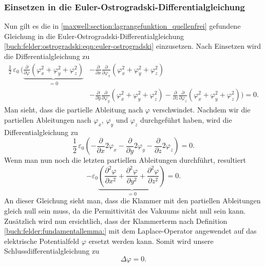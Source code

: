 \subsubsection{Einsetzen in die Euler-Ostrogradski-Differentialgleichung}
Nun gilt es die in \eqref{maxwell:section:lagrangefunktion_quellenfrei} gefundene Gleichung in die Euler-Ostrogradski-Differentialgleichung \eqref{buch:felder:ostrogradski:eqn:euler-ostrogradski} einzusetzen.
Nach Einsetzen wird die Differentialgleichung zu
\begin{align*}
\frac{1}{2}\,\varepsilon_0\,\biggl(\underbrace{\frac{\partial}{\partial\varphi}\left(\varphi_x^2 + \varphi_y^2 + \varphi_z^2\right)}_{\displaystyle=0} &- \frac{\partial}{\partial x}\frac{\partial}{\partial \varphi_x}\left(\varphi_x^2 + \varphi_y^2 + \varphi_z^2\right)\\
&- \frac{\partial}{\partial y}\frac{\partial}{\partial \varphi_y}\left(\varphi_x^2 + \varphi_y^2 + \varphi_z^2\right) - 
\frac{\partial}{\partial z}\frac{\partial}{\partial \varphi_z}\left(\varphi_x^2 + \varphi_y^2 + \varphi_z^2\right)\biggr)
=
0.
\end{align*}
Man sieht, dass die partielle Ableitung nach $\varphi$ verschwindet.
Nachdem wir die partiellen Ableitungen nach $\varphi_x$, $\varphi_y$ und $\varphi_z$ durchgeführt haben, wird die Differentialgleichung zu
\[
\frac{1}{2}\,\varepsilon_0\left(-\frac{\partial}{\partial x}2\varphi_x - \frac{\partial}{\partial y}2\varphi_y - \frac{\partial}{\partial z}2\varphi_z\right)
=
0.
\]
Wenn man nun noch die letzten partiellen Ableitungen durchführt, resultiert
\begin{equation}
	- \varepsilon_0\underbrace{\left(\frac{\partial^2\varphi}{\partial x^2} + \frac{\partial^2\varphi}{\partial y^2} + \frac{\partial^2\varphi}{\partial z^2}\right)}_{\displaystyle=0}
	=
	0.
	\label{maxwell:section:laplace_gleichung_1}
\end{equation}
An dieser Gleichung sieht man, dass die Klammer mit den partiellen Ableitungen gleich null sein muss, da die Permittivität des Vakuums nicht null sein kann.
Zusätzlich wird nun ersichtlich, dass der Klammerterm nach Definition \eqref{buch:felder:fundamentallemma:} mit dem Laplace-Operator angewendet auf das elektrische Potentialfeld $\varphi$ ersetzt werden kann.
Somit wird unsere Schlussdifferentialgleichung zu
\begin{equation}
	\Delta\varphi
	=
	0.
	\label{maxwell:section:laplace_gleichung_2}
\end{equation}
